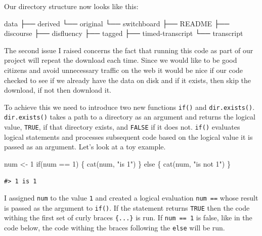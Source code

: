 \documentclass[
  letterpaper,
]{scrbook}
\newenvironment{Shaded}{\begin{snugshade}}{\end{snugshade}}
\newcommand{\ControlFlowTok}[1]{\textcolor[rgb]{0.00,0.00,0.00}{#1}}
\newcommand{\DecValTok}[1]{\textcolor[rgb]{0.00,0.00,0.00}{#1}}
\newcommand{\ExtensionTok}[1]{\textcolor[rgb]{0.00,0.00,0.00}{#1}}
\newcommand{\FunctionTok}[1]{\textcolor[rgb]{0.00,0.00,0.00}{#1}}
\newcommand{\NormalTok}[1]{\textcolor[rgb]{0.00,0.00,0.00}{#1}}
\newcommand{\OtherTok}[1]{\textcolor[rgb]{0.00,0.00,0.00}{#1}}
\newcommand{\SpecialCharTok}[1]{\textcolor[rgb]{0.00,0.00,0.00}{#1}}
\newcommand{\StringTok}[1]{\textcolor[rgb]{0.00,0.00,0.00}{#1}}
\begin{document}
Our directory structure now looks like this:

\begin{Shaded}
\begin{Highlighting}[]
\ExtensionTok{data}
\ExtensionTok{├──}\NormalTok{ derived}
\ExtensionTok{└──}\NormalTok{ original}
    \ExtensionTok{└──}\NormalTok{ switchboard}
        \ExtensionTok{├──}\NormalTok{ README}
        \ExtensionTok{├──}\NormalTok{ discourse}
        \ExtensionTok{├──}\NormalTok{ disfluency}
        \ExtensionTok{├──}\NormalTok{ tagged}
        \ExtensionTok{├──}\NormalTok{ timed{-}transcript}
        \ExtensionTok{└──}\NormalTok{ transcript}
\end{Highlighting}
\end{Shaded}

The second issue I raised concerns the fact that running this code as
part of our project will repeat the download each time. Since we would
like to be good citizens and avoid unnecessary traffic on the web it
would be nice if our code checked to see if we already have the data on
disk and if it exists, then skip the download, if not then download it.

To achieve this we need to introduce two new functions \texttt{if()} and
\texttt{dir.exists()}. \texttt{dir.exists()} takes a path to a directory
as an argument and returns the logical value, \texttt{TRUE}, if that
directory exists, and \texttt{FALSE} if it does not. \texttt{if()}
evaluates logical statements and processes subsequent code based on the
logical value it is passed as an argument. Let's look at a toy example.

\begin{Shaded}
\begin{Highlighting}[]
\NormalTok{num }\OtherTok{\textless{}{-}} \DecValTok{1}
\ControlFlowTok{if}\NormalTok{(num }\SpecialCharTok{==} \DecValTok{1}\NormalTok{) \{ }
  \FunctionTok{cat}\NormalTok{(num, }\StringTok{"is 1"}\NormalTok{) }
\NormalTok{  \} }\ControlFlowTok{else}\NormalTok{ \{}
  \FunctionTok{cat}\NormalTok{(num, }\StringTok{"is not 1"}\NormalTok{)}
\NormalTok{  \}}
\end{Highlighting}
\end{Shaded}

\begin{verbatim}
#> 1 is 1
\end{verbatim}

I assigned \texttt{num} to the value \texttt{1} and created a logical
evaluation \texttt{num\ ==} whose result is passed as the argument to
\texttt{if()}. If the statement returns \texttt{TRUE} then the code
withing the first set of curly braces \texttt{\{...\}} is run. If
\texttt{num\ ==\ 1} is false, like in the code below, the code withing
the braces following the \texttt{else} will be run.
\end{document}
